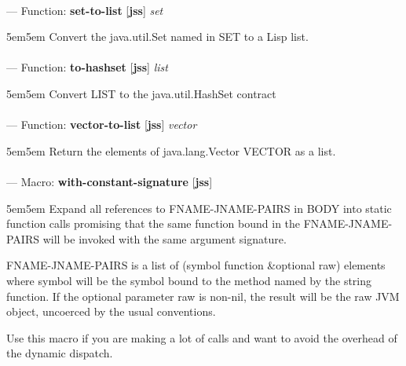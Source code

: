 \paragraph{}
\label{JSS:SET-TO-LIST}
--- Function: \textbf{set-to-list} [\textbf{jss}] \textit{set}

\begin{adjustwidth}{5em}{5em}
Convert the java.util.Set named in SET to a Lisp list.
\end{adjustwidth}

\paragraph{}
\label{JSS:TO-HASHSET}
--- Function: \textbf{to-hashset} [\textbf{jss}] \textit{list}

\begin{adjustwidth}{5em}{5em}
Convert LIST to the java.util.HashSet contract
\end{adjustwidth}

\paragraph{}
\label{JSS:VECTOR-TO-LIST}
--- Function: \textbf{vector-to-list} [\textbf{jss}] \textit{vector}

\begin{adjustwidth}{5em}{5em}
Return the elements of java.lang.Vector VECTOR as a list.
\end{adjustwidth}

\paragraph{}
\label{JSS:WITH-CONSTANT-SIGNATURE}
--- Macro: \textbf{with-constant-signature} [\textbf{jss}] \textit{}

\begin{adjustwidth}{5em}{5em}
Expand all references to FNAME-JNAME-PAIRS in BODY into static function calls promising that the same function bound in the FNAME-JNAME-PAIRS will be invoked with the same argument signature.

FNAME-JNAME-PAIRS is a list of (symbol function \&optional raw)
elements where symbol will be the symbol bound to the method named by
the string function.  If the optional parameter raw is non-nil, the
result will be the raw JVM object, uncoerced by the usual conventions.

Use this macro if you are making a lot of calls and 
want to avoid the overhead of the dynamic dispatch.
\end{adjustwidth}

